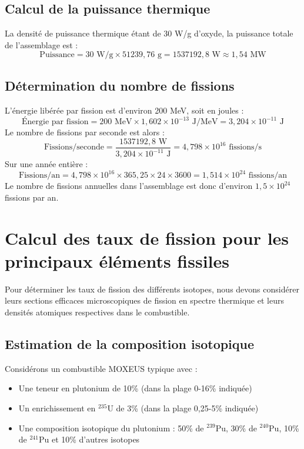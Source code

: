 \documentclass{article}
\begin{document}
\subsection{Calcul de la puissance thermique}
La densité de puissance thermique étant de 30 W/g d'oxyde, la puissance totale de l'assemblage est :
\begin{equation}
  \text{Puissance} = 30 \text{ W/g} \times 51 239,76 \text{ g} = 1 537 192,8 \text{ W} \approx 1,54 \text{ MW}
\end{equation}

\subsection{Détermination du nombre de fissions}
L'énergie libérée par fission est d'environ 200 MeV, soit en joules :
\begin{equation}
  \text{Énergie par fission} = 200 \text{ MeV} \times 1,602 \times 10^{-13} \text{ J/MeV} = 3,204 \times 10^{-11} \text{ J}
\end{equation}
Le nombre de fissions par seconde est alors :
\begin{equation}
  \text{Fissions/seconde} = \frac{1 537 192,8 \text{ W}}{3,204 \times 10^{-11} \text{ J}} = 4,798 \times 10^{16} \text{ fissions/s}
\end{equation}
Sur une année entière :
\begin{equation}
  \text{Fissions/an} = 4,798 \times 10^{16} \times 365,25 \times 24 \times 3600 = 1,514 \times 10^{24} \text{ fissions/an}
\end{equation}
Le nombre de fissions annuelles dans l'assemblage est donc d'environ $1,5 \times 10^{24}$ fissions par an.

\section{Calcul des taux de fission pour les principaux éléments fissiles}
Pour déterminer les taux de fission des différents isotopes, nous devons considérer leurs sections efficaces microscopiques de fission en spectre thermique et leurs densités atomiques respectives dans le combustible.

\subsection{Estimation de la composition isotopique}
Considérons un combustible MOXEUS typique avec :
\begin{itemize}
  \item Une teneur en plutonium de 10\% (dans la plage 0-16\% indiquée)
  \item Un enrichissement en $^{235}$U de 3\% (dans la plage 0,25-5\% indiquée)
  \item Une composition isotopique du plutonium : 50\% de $^{239}$Pu, 30\% de $^{240}$Pu, 10\% de $^{241}$Pu et 10\% d'autres isotopes
\end{itemize}
\end{document}
